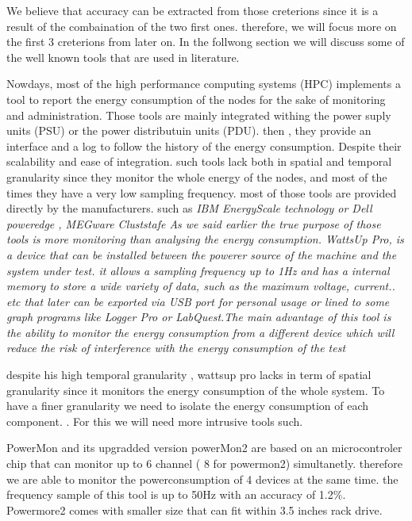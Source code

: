 We believe that accuracy can be extracted from those creterions since it is a result of the combaination of the two first ones. therefore, we will focus more on the first 3 creterions from later on.
In the follwong section we will discuss some of the well known tools that are used in literature.


Nowdays, most of the high performance computing systems (HPC) implements a tool to report the energy consumption of the nodes for the sake of monitoring and administration. Those tools are mainly integrated withing the power suply units (PSU) or the power distributuin units (PDU). then , they provide an interface and a log to follow the history of the energy consumption. Despite their scalability and ease of integration. such tools lack both in spatial and temporal granularity since they monitor the whole energy of the nodes, and most of the times they have a very low sampling frequency. most of those tools are provided directly by the manufacturers. such as \em{IBM EnergyScale technology} \cite{mccreary2007energyscale} \cite{caldeira2014ibm} \cite{caldeiraibm} or \em{Dell poweredge} \cite{lovicott2009thermal}, MEGware Cluststafe \cite{breitbart2015case}
As we said earlier the true purpose of those tools is more monitoring than analysing the energy consumption.
WattsUp Pro, is a device that can be installed  between the  powerer source of the machine and the system under test. it allows a sampling frequency up to 1Hz and has a internal memory to store a wide variety of data, such as the maximum voltage, current.. etc that later can be exported via USB port for personal usage or lined to some graph programs like Logger Pro or LabQuest.The main advantage of this tool is the ability to monitor the energy consumption from a different device which will reduce the risk of interference with the energy consumption of the test %
\cite{hirst2013watts}

despite his high temporal granularity  , wattsup pro lacks in term of spatial granularity since it monitors the energy consumption of the whole system.
To have a finer granularity we need to isolate the energy consumption of each component.
.
For this we will need more intrusive tools such.



PowerMon and its upgradded version powerMon2 \cite{bedard2010powermon} are based on an microcontroler chip that can monitor up to 6 channel ( 8 for powermon2) simultanetly. therefore we are able to monitor the powerconsumption of 4 devices at the same time. the frequency sample of this tool is up to 50Hz with an accuracy of 1.2\%. Powermore2 comes with smaller size that can fit within 3.5 inches rack drive.

